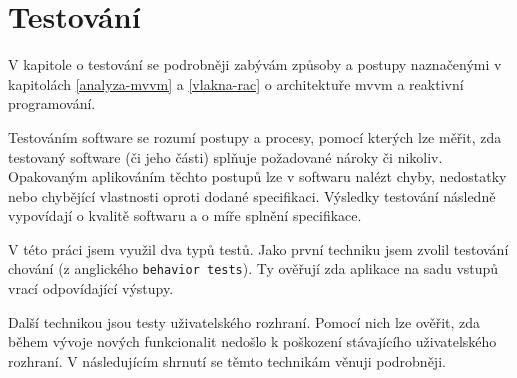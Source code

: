 \chapter{Testování}\label{testovani}

V kapitole o testování se podrobněji zabývám způsoby a postupy naznačenými v kapitolách \ref{analyza-mvvm} a \ref{vlakna-rac} o architektuře \acrshort{mvvm} a reaktivní programování.

Testováním software se rozumí postupy a procesy, pomocí kterých lze měřit, zda testovaný software (či jeho části) splňuje požadované nároky či nikoliv.
Opakovaným aplikováním těchto postupů lze v softwaru nalézt chyby, nedostatky nebo chybějící vlastnosti oproti dodané specifikaci.
Výsledky testování následně vypovídají o kvalitě softwaru a o míře splnění specifikace. \cite{software-testing-definition}

\bigskip

V této práci jsem využil dva typů testů.
Jako první techniku jsem zvolil testování chování (z anglického \texttt{behavior tests}).
Ty ověřují zda aplikace na sadu vstupů vrací odpovídající výstupy.

Další technikou jsou testy uživatelského rozhraní.
Pomocí nich lze ověřit, zda během vývoje nových funkcionalit nedošlo k poškození stávajícího uživatelského rozhraní.
V následujícím shrnutí se těmto technikám věnuji podrobněji.







